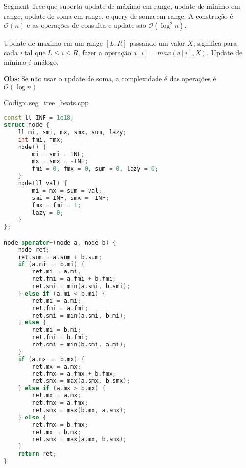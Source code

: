 \documentclass[10pt, a4paper, oneside]{book}
\begin{document}
Segment Tree que suporta update de máximo em range, update de mínimo em range, update de soma em range, e query de soma em range. A construção é $\mathcal{O}(n)$ e as operações de consulta e update são $\mathcal{O}(\log^2 n)$.



Update de máximo em um range $[L, R]$ passando um valor $X$, significa para cada $i$ tal que $L \le i \le R$, fazer a operação $a[i] = max(a[i], X)$. Update de mínimo é análogo.



\textbf{Obs}: Se não usar o update de soma, a complexidade é das operações é $\mathcal{O}(\log n)$

\hfill

Codigo: seg\_tree\_beats.cpp

\begin{lstlisting}[language=C++]
const ll INF = 1e18;
struct node {
    ll mi, smi, mx, smx, sum, lazy;
    int fmi, fmx;
    node() {
        mi = smi = INF;
        mx = smx = -INF;
        fmi = 0, fmx = 0, sum = 0, lazy = 0;
    }
    node(ll val) {
        mi = mx = sum = val;
        smi = INF, smx = -INF;
        fmx = fmi = 1;
        lazy = 0;
    }
};

node operator+(node a, node b) {
    node ret;
    ret.sum = a.sum + b.sum;
    if (a.mi == b.mi) {
        ret.mi = a.mi;
        ret.fmi = a.fmi + b.fmi;
        ret.smi = min(a.smi, b.smi);
    } else if (a.mi < b.mi) {
        ret.mi = a.mi;
        ret.fmi = a.fmi;
        ret.smi = min(a.smi, b.mi);
    } else {
        ret.mi = b.mi;
        ret.fmi = b.fmi;
        ret.smi = min(b.smi, a.mi);
    }
    if (a.mx == b.mx) {
        ret.mx = a.mx;
        ret.fmx = a.fmx + b.fmx;
        ret.smx = max(a.smx, b.smx);
    } else if (a.mx > b.mx) {
        ret.mx = a.mx;
        ret.fmx = a.fmx;
        ret.smx = max(b.mx, a.smx);
    } else {
        ret.fmx = b.fmx;
        ret.mx = b.mx;
        ret.smx = max(a.mx, b.smx);
    }
    return ret;
}


\end{lstlisting}
\end{document}
